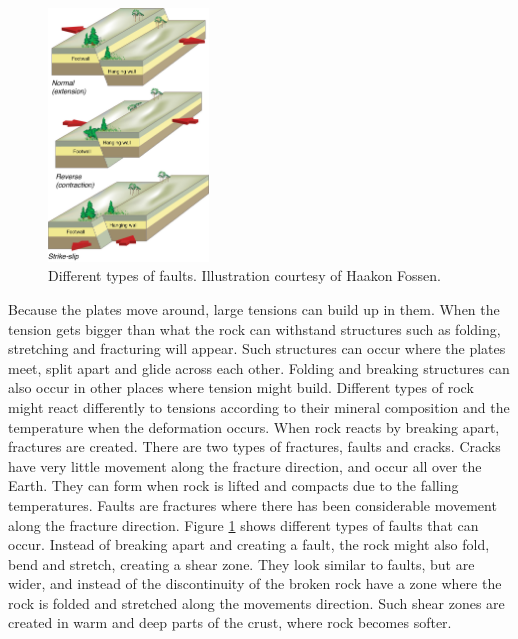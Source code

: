 \documentclass[a4paper,12pt]{report}
\begin{document}
\begin{figure}

  \begin{center}
    \includegraphics[width=0.38\textwidth]{thesis/geo/english/faults.jpg}
  \end{center}
 
  \caption{Different types of faults. Illustration courtesy of Haakon Fossen.}
  \vspace{15pt}
  \label{fig:faults}
  
\end{figure}
Because the plates move around, large tensions can build up in them. When the tension gets bigger than what the rock can withstand structures such as folding, stretching and fracturing will appear. Such structures can occur where the plates meet, split apart and glide across each other. Folding and breaking structures can also occur in other places where tension might build. Different types of rock might react differently to tensions according to their mineral composition and the temperature when the deformation occurs. When rock reacts by breaking apart, fractures are created. There are two types of fractures, faults and cracks. Cracks have very little movement along the fracture direction, and occur all over the Earth. 
They can form when rock is lifted and compacts due to the falling temperatures. Faults are fractures where there has been considerable movement along the fracture direction. Figure \ref{fig:faults} shows different types of faults that can occur. 
Instead of breaking apart and creating a fault, 
the rock might also fold, bend and stretch, creating a shear zone. They look similar to faults, but are wider, and instead of the discontinuity of the broken rock have a zone where the rock is folded and stretched along the movements direction. Such shear zones are created in warm and deep parts of the crust, where rock becomes softer.
\end{document}
